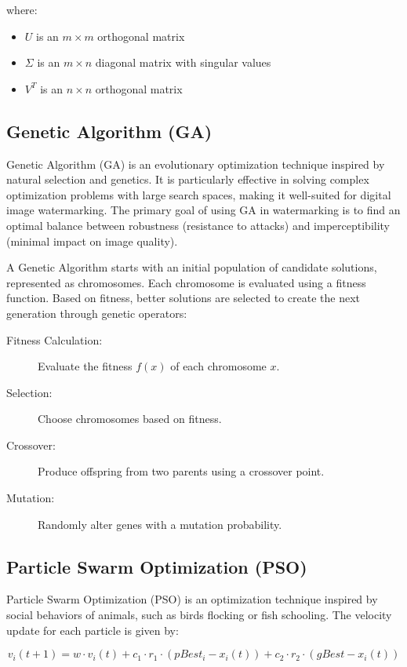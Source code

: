 where:
\begin{itemize}
    \item $U$ is an $m \times m$ orthogonal matrix
    \item $\Sigma$ is an $m \times n$ diagonal matrix with singular values
    \item $V^T$ is an $n \times n$ orthogonal matrix
\end{itemize}

\subsection{Genetic Algorithm (GA)}

Genetic Algorithm (GA) is an evolutionary optimization technique inspired by natural selection and genetics. It is particularly effective in solving complex optimization problems with large search spaces, making it well-suited for digital image watermarking. The primary goal of using GA in watermarking is to find an optimal balance between robustness (resistance to attacks) and imperceptibility (minimal impact on image quality).

A Genetic Algorithm starts with an initial population of candidate solutions, represented as chromosomes. Each chromosome is evaluated using a fitness function. Based on fitness, better solutions are selected to create the next generation through genetic operators:

\begin{description}
    \item[Fitness Calculation:] Evaluate the fitness $f(x)$ of each chromosome $x$.
    \item[Selection:] Choose chromosomes based on fitness.
    \item[Crossover:] Produce offspring from two parents using a crossover point.
    \item[Mutation:] Randomly alter genes with a mutation probability.
\end{description}

\subsection{Particle Swarm Optimization (PSO)}

Particle Swarm Optimization (PSO) is an optimization technique inspired by social behaviors of animals, such as birds flocking or fish schooling. The velocity update for each particle is given by:

\begin{equation}
v_i(t+1) = w \cdot v_i(t) + c_1 \cdot r_1 \cdot (pBest_i - x_i(t)) + c_2 \cdot r_2 \cdot (gBest - x_i(t))
\end{equation}

